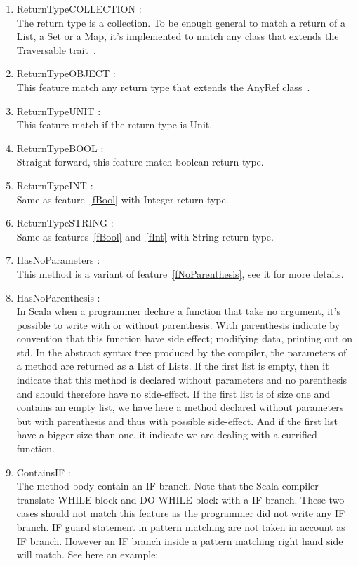 \documentclass[12pt]{article}
\begin{document}
\begin{enumerate}
\item ReturnTypeCOLLECTION :\\
	The return type is a collection. To be enough general to match a return of a List, a Set or a Map, it's implemented to match any class that extends the Traversable trait~\cite{travers}.
\item ReturnTypeOBJECT : \\
	This feature match any return type that extends the AnyRef class~\cite{anyRef}.
\item ReturnTypeUNIT :\\
	This feature match if the return type is Unit.
\item ReturnTypeBOOL : \label{fBool}\\
	Straight forward, this feature match boolean return type.
\item ReturnTypeINT :\label{fInt}\\
	Same as feature~\ref{fBool} with Integer return type.
\item ReturnTypeSTRING : \\
	Same as features~\ref{fBool} and~\ref{fInt} with String return type.
\item HasNoParameters :\label{fNoParam}\\
	This method is a variant of feature~\ref{fNoParenthesis}, see it for more details.
\item HasNoParenthesis :\label{fNoParenthesis}\\
In Scala when a programmer declare a function that take no argument, it's possible to write with or without parenthesis. With parenthesis indicate by convention that this function have side effect; modifying data, printing out on std. In the abstract syntax tree produced by the compiler, the parameters of a method are returned as a List of Lists. If the first list is empty, then it indicate that this method is declared without parameters and no parenthesis and should therefore have no side-effect. If the first list is of size one and contains an empty list, we have here a method declared without parameters but with parenthesis and thus with possible side-effect. And if the first list have a bigger size than one, it indicate we are dealing with a currified function.
\item ContainsIF :\\
	The method body contain an IF branch. Note that the Scala compiler translate WHILE block and DO-WHILE block with a IF branch. These two cases should not match this feature as the programmer did not write any IF branch. IF guard statement in pattern matching are not taken in account as IF branch. However an IF branch inside a pattern matching right hand side will match. See here an example:\\ \\

\end{enumerate}
\end{document}
